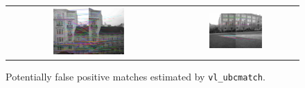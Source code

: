 \begin{figure}[h]
	\centering
	\begin{tabular}{cc}
	\includegraphics[width=0.45\textwidth]{figures/ransac_removes1.png} &
	\includegraphics[width=0.45\textwidth]{figures/ransac_removes2.png} 

	\end{tabular}
	\caption{Potentially false positive matches estimated by \texttt{vl\_ubcmatch}. }
	\label{fig:a4:ransac_removes}
\end{figure}


